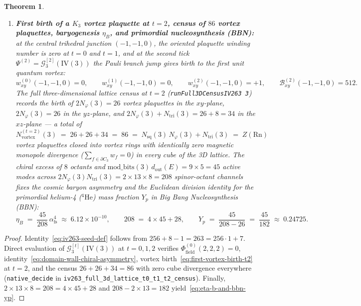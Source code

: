 \documentclass[11pt,a4paper]{article}
\theoremstyle{plain}
\newtheorem{theorem}{Theorem}[section]
\theoremstyle{definition}
\begin{document}
\begin{theorem}
\begin{enumerate}[label=\textbf{(\arabic*)},leftmargin=*]
\item \textbf{First birth of a $K_3$ vortex plaquette at $t = 2$, census of $86$ vortex plaquettes, baryogenesis $\eta_B$, and primordial nucleosynthesis (BBN):}
  at the central trihedral junction $(-1, -1, 0)$, the oriented plaquette winding number is zero at $t = 0$ and $t = 1$, and at the second tick $\Psi^{(2)} = \mathcal{G}_3^{[2]}(\mathrm{IV}(3))$ the Pauli branch jump gives birth to the first unit quantum vortex:
  \begin{equation}
    \label{eq:first-vortex-birth-t2}
    w_{xy}^{(0)}(-1,-1,0) = 0, \qquad
    w_{xy}^{(1)}(-1,-1,0) = 0, \qquad
    w_{xy}^{(2)}(-1,-1,0) = +1, \qquad
    \mathcal{B}_{xy}^{(2)}(-1,-1,0) = 512.
  \end{equation}
  The full three-dimensional lattice census at $t = 2$ (\texttt{runFull3DCensusIV263 3}) records the birth of $2 N_\varphi(3) = 26$ vortex plaquettes in the $xy$-plane, $2 N_\varphi(3) = 26$ in the $yz$-plane, and $2 N_\varphi(3) + N_{\mathrm{tri}}(3) = 26 + 8 = 34$ in the $xz$-plane --- a total of
  \begin{equation}
    \label{eq:t2-86-vortex-plaquettes}
    N_{\mathrm{vortex}}^{(t=2)}(3) \;=\; 26 + 26 + 34 \;=\; 86 \;=\; N_{\mathrm{sq}}(3)\,N_\varphi(3) + N_{\mathrm{tri}}(3) \;=\; Z(\mathrm{Rn})
  \end{equation}
  vortex plaquettes closed into vortex rings with identically zero magnetic monopole divergence ($\sum_{f\in\partial C_3} w_f = 0$) in every cube of the 3D lattice. The chiral excess of $8$ octants and $\mathrm{mod\_bits}(3)\,d_{\mathrm{out}}(E) = 9\times 5 = 45$ active modes across $2 N_\varphi(3) N_{\mathrm{tri}}(3) = 2\times 13\times 8 = 208$ spinor-octant channels fixes the cosmic baryon asymmetry and the Euclidean division identity for the primordial helium-4 ($^4\mathrm{He}$) mass fraction $Y_p$ in Big Bang Nucleosynthesis (BBN):
  \begin{equation}
    \label{eq:eta-b-and-bbn-yp}
    \eta_B \;=\; \frac{45}{208}\,\alpha_{\mathrm{fs}}^4 \;\approx\; 6.12\times 10^{-10}, \qquad
    208 \;=\; 4 \times 45 + 28, \qquad
    Y_p \;=\; \frac{45}{208 - 26} \;=\; \frac{45}{182} \;\approx\; 0.24725.
  \end{equation}
\end{enumerate}
\end{theorem}

\begin{proof}
Identity~\eqref{eq:iv263-seed-def} follows from $256 + 8 - 1 = 263 = 256\cdot 1 + 7$. Direct evaluation of $\mathcal{G}_3^{[t]}(\mathrm{IV}(3))$ at $t = 0, 1, 2$ verifies $\Phi_{\mathrm{field}}^{(0)}(2,2,2) = 0$, identity~\eqref{eq:domain-wall-chiral-asymmetry}, vortex birth~\eqref{eq:first-vortex-birth-t2} at $t = 2$, and the census $26 + 26 + 34 = 86$ with zero cube divergence everywhere (\texttt{native\_decide} in \texttt{iv263\_full\_3d\_lattice\_t0\_t1\_t2\_census}). Finally, $2\times 13\times 8 = 208 = 4\times 45 + 28$ and $208 - 2\times 13 = 182$ yield~\eqref{eq:eta-b-and-bbn-yp}.
\end{proof}
\end{document}
